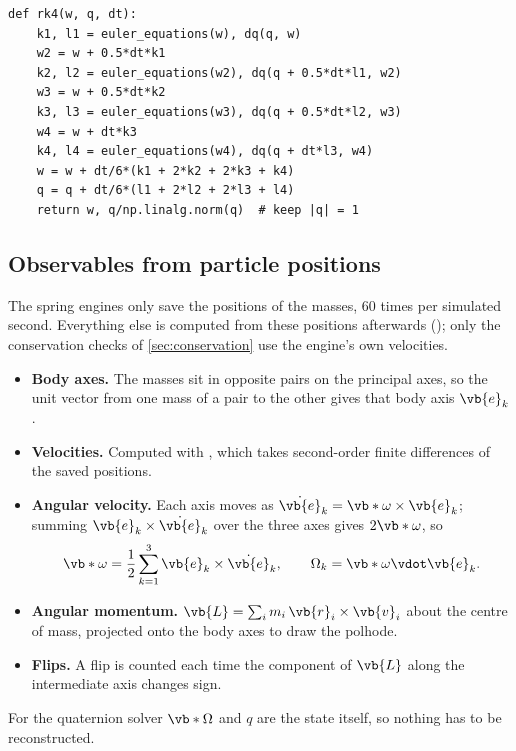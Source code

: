 \medskip\noindent\begin{minipage}{\linewidth}
\begin{verbatim}
def rk4(w, q, dt):
    k1, l1 = euler_equations(w), dq(q, w)
    w2 = w + 0.5*dt*k1
    k2, l2 = euler_equations(w2), dq(q + 0.5*dt*l1, w2)
    w3 = w + 0.5*dt*k2
    k3, l3 = euler_equations(w3), dq(q + 0.5*dt*l2, w3)
    w4 = w + dt*k3
    k4, l4 = euler_equations(w4), dq(q + dt*l3, w4)
    w = w + dt/6*(k1 + 2*k2 + 2*k3 + k4)
    q = q + dt/6*(l1 + 2*l2 + 2*l3 + l4)
    return w, q/np.linalg.norm(q)  # keep |q| = 1
\end{verbatim}
\label{lst:rk4}
\end{minipage}\par\medskip

\subsection{Observables from particle positions}
\label{sec:observables}
The spring engines only save the positions of the masses, 60 times per simulated second.
Everything else is computed from these positions afterwards (); only the conservation checks of \cref{sec:conservation} use the engine's own velocities.
\begin{sloppypar} %
\begin{itemize}
    \item \textbf{Body axes.} The masses sit in opposite pairs on the principal axes, so the unit vector from one mass of a pair to the other gives that body axis $\vb{e}_k$.
    \item \textbf{Velocities.} Computed with , which takes second-order finite differences of the saved positions.
    \item \textbf{Angular velocity.} Each axis moves as $\dot{\vb{e}}_k=\vb*{\omega}\times\vb{e}_k$; summing $\vb{e}_k\times\dot{\vb{e}}_k$ over the three axes gives $2\vb*{\omega}$, so
    \begin{equation}
        \vb*{\omega} = \frac12\sum_{k=1}^{3}\vb{e}_k\times\dot{\vb{e}}_k,
        \qquad \Omega_k = \vb*{\omega}\vdot\vb{e}_k.
        \label{eq:omega-from-axes}
    \end{equation}
    \item \textbf{Angular momentum.} $\vb{L}=\sum_i m_i\,\vb{r}_i\times\vb{v}_i$ about the centre of mass, projected onto the body axes to draw the polhode.
    \item \textbf{Flips.} A flip is counted each time the component of $\vb{L}$ along the intermediate axis changes sign.
\end{itemize}
\end{sloppypar}
For the quaternion solver $\vb*{\Omega}$ and $q$ are the state itself, so nothing has to be reconstructed.

